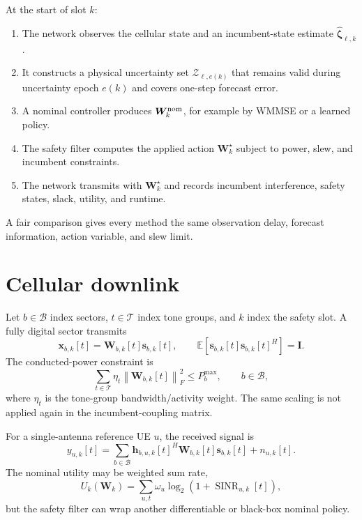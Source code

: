 \documentclass[11pt]{article}
\newcommand{\W}{\bm W}
\newcommand{\Zset}{\mathcal Z}
\newcommand{\E}{\mathbb E}
\newcommand{\norm}[1]{\left\lVert #1\right\rVert}
\begin{document}
At the start of slot $k$:

\begin{enumerate}
\item The network observes the cellular state and an incumbent-state estimate $\widehat{\bm\zeta}_{\ell,k}$.
\item It constructs a physical uncertainty set $\Zset_{\ell,e(k)}$ that remains valid during uncertainty epoch $e(k)$ and covers one-step forecast error.
\item A nominal controller produces $\W_k^{\rm nom}$, for example by WMMSE or a learned policy.
\item The safety filter computes the applied action $\W_k^\star$ subject to power, slew, and incumbent constraints.
\item The network transmits with $\W_k^\star$ and records incumbent interference, safety states, slack, utility, and runtime.
\end{enumerate}

A fair comparison gives every method the same observation delay, forecast information, action variable, and slew limit.

\section{Cellular downlink}

Let $b\in\mathcal B$ index sectors, $t\in\mathcal T$ index tone groups, and $k$ index the safety slot. A fully digital sector transmits
\begin{equation}
 \bm x_{b,k}[t]=\W_{b,k}[t]\bm s_{b,k}[t],
 \qquad \E[\bm s_{b,k}[t]\bm s_{b,k}[t]^H]=\bm I.
\end{equation}
The conducted-power constraint is
\begin{equation}
 \sum_{t\in\mathcal T}\eta_t\norm{\W_{b,k}[t]}_F^2\le P_b^{\max},
 \qquad b\in\mathcal B,
 \label{eq:power}
\end{equation}
where $\eta_t$ is the tone-group bandwidth/activity weight. The same scaling is not applied again in the incumbent-coupling matrix.

For a single-antenna reference UE $u$, the received signal is
\begin{equation}
 y_{u,k}[t]=\sum_{b\in\mathcal B}\bm h_{b,u,k}[t]^H\W_{b,k}[t]\bm s_{b,k}[t]+n_{u,k}[t].
\end{equation}
The nominal utility may be weighted sum rate,
\begin{equation}
 U_k(\W_k)=\sum_{u,t}\omega_u\log_2\!\left(1+\operatorname{SINR}_{u,k}[t]\right),
\end{equation}
but the safety filter can wrap another differentiable or black-box nominal policy.
\end{document}
